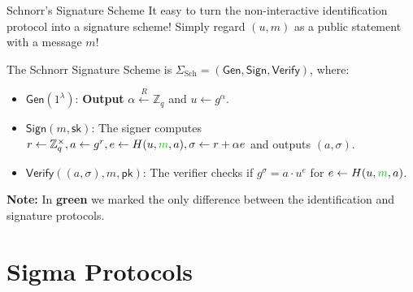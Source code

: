 \documentclass[xcolor={usenames,dvipsnames}]{beamer}
\begin{document}
    \begin{frame}{Schnorr's Signature Scheme}
        It easy to turn the non-interactive identification protocol into a signature scheme! Simply regard $(u,m)$ as a public statement with a message $m$!\pause

        \begin{definition}
            The Schnorr Signature Scheme is $\Sigma_{\text{Sch}} = (\mathsf{Gen}, \mathsf{Sign}, \mathsf{Verify})$, where:\pause
            \begin{itemize}
                \item $\mathsf{Gen}(1^{\lambda})$: \textbf{Output} $\alpha \xleftarrow{R} \mathbb{Z}_q$ and $u \gets g^{\alpha}$.\pause
                \item $\mathsf{Sign}(m,\mathsf{sk})$: The signer computes $r \gets \mathbb{Z}_q^{\times}, a \gets g^{r}, e \gets H(u, \textcolor{green!80!black}{m}, a), \sigma \gets r + \alpha e$ and outputs $(a,\sigma)$.\pause
                \item $\mathsf{Verify}((a, \sigma), m,\mathsf{pk})$: The verifier checks if $g^{\sigma} = a \cdot u^e$ for $e \gets H(u, \textcolor{green!80!black}{m}, a)$.
            \end{itemize}
        \end{definition}

        \textbf{Note:} In \textcolor{green!80!black}{\textbf{green}} we marked the only difference between the identification and signature protocols.
    \end{frame}

    \section{Sigma Protocols}
    
\end{document}
